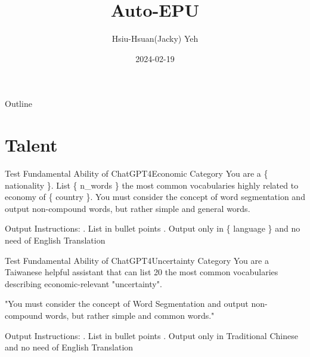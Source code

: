 \documentclass[11.5pt]{beamer}
\title{\huge{Auto-EPU}}
\author{Hsiu-Hsuan(Jacky) Yeh}
\date{2024-02-19}
\begin{document}
\maketitle


\begin{frame}{Outline}
\tableofcontents
\end{frame}


\section{Talent}


\begin{frame}{Test Fundamental Ability of ChatGPT4}{Economic Category}
You are a \{ nationality \}. List \{ n\_words \} the most common vocabularies highly related to economy of
\{ country \}. You must consider the concept of word segmentation and output
non-compound words, but rather simple and general words. \newline

Output Instructions: . List in bullet points . Output only in \{ language \} and no need of English Translation
\end{frame}


\begin{frame}{Test Fundamental Ability of ChatGPT4}{Uncertainty Category}
You are a Taiwanese helpful assistant that can list 20 the most common
vocabularies describing economic-relevant "uncertainty". \newline

"You must consider the concept of Word Segmentation and output non-compound
words, but rather simple and common words." \newline

Output Instructions: . List in bullet points . Output only in Traditional Chinese and no need of English Translation
\end{frame}
\end{document}
